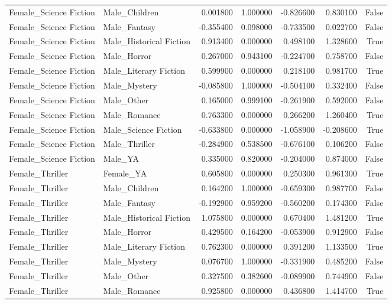 \begin{tabular}{llrrrrr}
Female_Science Fiction & Male_Children & 0.001800 & 1.000000 & -0.826600 & 0.830100 & False \\
Female_Science Fiction & Male_Fantasy & -0.355400 & 0.098000 & -0.733500 & 0.022700 & False \\
Female_Science Fiction & Male_Historical Fiction & 0.913400 & 0.000000 & 0.498100 & 1.328600 & True \\
Female_Science Fiction & Male_Horror & 0.267000 & 0.943100 & -0.224700 & 0.758700 & False \\
Female_Science Fiction & Male_Literary Fiction & 0.599900 & 0.000000 & 0.218100 & 0.981700 & True \\
Female_Science Fiction & Male_Mystery & -0.085800 & 1.000000 & -0.504100 & 0.332400 & False \\
Female_Science Fiction & Male_Other & 0.165000 & 0.999100 & -0.261900 & 0.592000 & False \\
Female_Science Fiction & Male_Romance & 0.763300 & 0.000000 & 0.266200 & 1.260400 & True \\
Female_Science Fiction & Male_Science Fiction & -0.633800 & 0.000000 & -1.058900 & -0.208600 & True \\
Female_Science Fiction & Male_Thriller & -0.284900 & 0.538500 & -0.676100 & 0.106200 & False \\
Female_Science Fiction & Male_YA & 0.335000 & 0.820000 & -0.204000 & 0.874000 & False \\
Female_Thriller & Female_YA & 0.605800 & 0.000000 & 0.250300 & 0.961300 & True \\
Female_Thriller & Male_Children & 0.164200 & 1.000000 & -0.659300 & 0.987700 & False \\
Female_Thriller & Male_Fantasy & -0.192900 & 0.959200 & -0.560200 & 0.174300 & False \\
Female_Thriller & Male_Historical Fiction & 1.075800 & 0.000000 & 0.670400 & 1.481200 & True \\
Female_Thriller & Male_Horror & 0.429500 & 0.164200 & -0.053900 & 0.912900 & False \\
Female_Thriller & Male_Literary Fiction & 0.762300 & 0.000000 & 0.391200 & 1.133500 & True \\
Female_Thriller & Male_Mystery & 0.076700 & 1.000000 & -0.331900 & 0.485200 & False \\
Female_Thriller & Male_Other & 0.327500 & 0.382600 & -0.089900 & 0.744900 & False \\
Female_Thriller & Male_Romance & 0.925800 & 0.000000 & 0.436800 & 1.414700 & True \\

\end{tabular}
